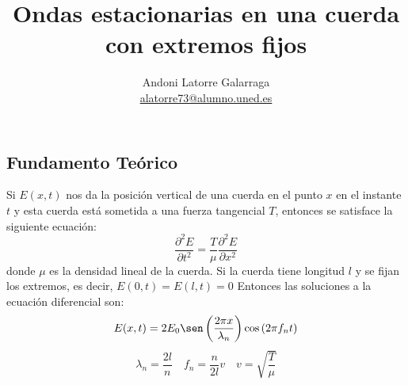 \documentclass{article}
\title{Ondas estacionarias en una cuerda con extremos fijos}
\author{Andoni Latorre Galarraga \\ \href{mailto:alatorre73@alumno.uned.es}{alatorre73@alumno.uned.es}}
\date{}
\begin{document}
\maketitle
\begin{abstract}

\end{abstract}

\begin{multicols}{2}

\section*{Fundamento Teórico}
Si $E(x,t)$ nos da la posición vertical de una cuerda en el punto $x$ en el instante $t$ y esta cuerda está sometida a una fuerza tangencial $T$, entonces se satisface la siguiente ecuación:
$$
\frac{\partial^2 E}{\partial t^2} = \frac{T}{\mu}\frac{\partial^2 E}{\partial x^2}
$$
donde $\mu$ es la densidad lineal de la cuerda. Si la cuerda tiene longitud $l$ y se fijan los extremos, es decir, $E(0,t)=E(l,t)=0$ Entonces las soluciones a la ecuación diferencial son:
$$
E(x,t)= 2E_0 \sen\left(\frac{2\pi x}{\lambda_n}\right)\cos\left(2\pi f_n t\right)
$$
$$
\lambda_n = \frac{2l}{n} \quad f_n = \frac{n}{2l}v \quad v=\sqrt{\frac{T}{\mu}}
$$

\end{multicols}
\end{document}
